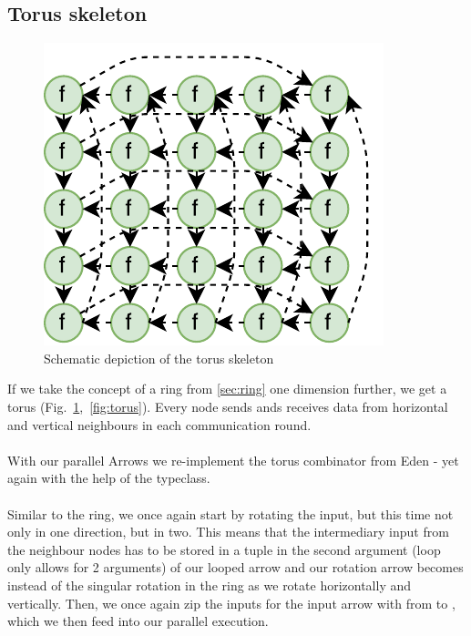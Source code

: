 \subsection{Torus skeleton}
\begin{figure}
	\includegraphics[scale=0.75]{images/torus}
	\caption{Schematic depiction of the torus skeleton}
	\label{fig:ringTorusImg}
\end{figure}
If we take the concept of a ring from \ref{sec:ring} one dimension further, we get a torus (Fig.~\ref{fig:ringTorusImg},~\ref{fig:torus}). Every node sends ands receives data from horizontal and vertical neighbours in each communication round.
\\\\
With our parallel Arrows we re-implement the torus combinator from Eden \citep{eden_skel_topology} - yet again with the help of the  typeclass.
\\\\
Similar to the ring, we once again start by rotating the input, but this time not only in one direction, but in two. This means that the intermediary input from the neighbour nodes has to be stored in a tuple \inlinecode{([[fut a]], [[fut b]])} in the second argument (loop only allows for 2 arguments) of our looped arrow  and our rotation arrow becomes  instead of the singular rotation in the ring as we rotate \inlinecode{[[fut a]]} horizontally and \inlinecode{[[fut b]]} vertically. Then, we once again zip the inputs for the input arrow with  from \inlinecode{([[c]], ([[fut a]], [[fut b]]))} to , which we then feed into our parallel execution.
